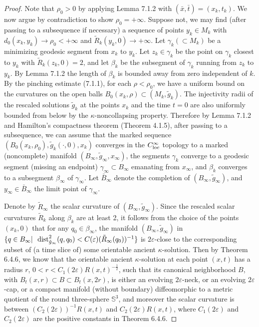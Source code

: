 \begin{proof}
Note that $\rho_0>0$ by applying Lemma 7.1.2 with
$(\bar{x},\bar{t})=(x_k,t_k).$ We now argue by contradiction to
show $\rho_0=+\infty.$ Suppose not, we may find (after passing to
a subsequence if necessary) a sequence of points $y_k\in M_k$ with
$d_{0}(x_k,y_k)\rightarrow \rho_0<+\infty$ and
$\tilde{R}_k(y_k,0)\rightarrow +\infty$. Let $\gamma_k(\subset
M_k)$ be a minimizing geodesic segment from $x_k$ to $y_k$. Let
$z_k\in \gamma_k$ be the point on $\gamma_k$ closest to $y_k$ with
$\tilde{R}_k(z_k,0)=2$, and let $\beta_k$ be the subsegment of
$\gamma_k$ running from $z_k$ to $y_k$. By Lemma 7.1.2 the length
of $\beta_k$ is bounded away from zero independent of $k$. By the
pinching estimate (7.1.1), for each $\rho<\rho_0$, we have a
uniform bound on the curvatures on the open balls
$B_{0}(x_k,\rho)\subset (M_k,\tilde{g}_k)$. The injectivity radii
of the rescaled solutions $\tilde{g}_k$ at the points $x_k$ and
the time $t=0$ are also uniformly bounded from below by the
$\kappa$-noncollapsing property. Therefore by Lemma 7.1.2 and
Hamilton's compactness theorem (Theorem 4.1.5), after passing to a
subsequence, we can assume that the marked sequence
$(B_{0}(x_k,\rho_0),\tilde{g}_k(\cdot,0),x_k)$ converges in the
$C_{\rm loc}^{\infty}$ topology to a marked (noncomplete) manifold
$(B_{\infty},\tilde{g}_{\infty},x_{\infty})$, the segments
$\gamma_k$ converge to a geodesic segment (missing an endpoint)
$\gamma_{\infty}\subset B_{\infty}$ emanating from $x_{\infty}$,
and $\beta_k$ converges to a subsegment $\beta_{\infty}$ of
$\gamma_{\infty}$. Let $\bar{B}_{\infty}$ denote the completion of
$(B_{\infty},\tilde{g}_{\infty})$, and $y_{\infty}\in
\bar{B}_{\infty}$ the limit point of $\gamma_{\infty}$.

Denote by $\tilde{R}_{\infty}$ the scalar curvature of
$(B_{\infty},\tilde{g}_{\infty})$. Since the rescaled scalar
curvatures $\tilde{R}_k$ along $\beta_k$ are at least 2, it
follows from the choice of the points $(x_k,0)$ that for any
$q_0\in \beta_{\infty}$, the manifold
$(B_{\infty},\tilde{g}_{\infty})$ in $\{q\in B_{\infty}| \ \ {\rm
dist}^2_{\tilde{g}_{\infty}}(q,q_0)<
C(\varepsilon)(\tilde{R}_{\infty}(q_0))^{-1}\}$ is
$2\varepsilon$-close to the corresponding subset of (a time slice
of) some orientable ancient $\kappa$-solution. Then by Theorem
6.4.6, we know that the orientable ancient $\kappa$-solution at
each point $(x,t)$ has a radius $r$, $0 < r <
C_1(2\varepsilon)R(x,t)^{-\frac{1}{2}}$, such that its canonical
neighborhood $B$, with $B_t(x,r) \subset  B \subset B_t(x,2r)$, is
either an evolving $2\varepsilon$-neck, or an evolving
$2\varepsilon$-cap, or a compact manifold (without boundary)
diffeomorphic to a metric quotient of the round three-sphere
$\mathbb{S}^3$, and moreover the scalar curvature is between
$(C_2(2\varepsilon))^{-1}R(x,t)$ and $C_2(2\varepsilon)R(x,t)$,
where $C_1(2\varepsilon)$ and $C_2(2\varepsilon)$ are the positive
constants in Theorem 6.4.6.


\end{proof}
